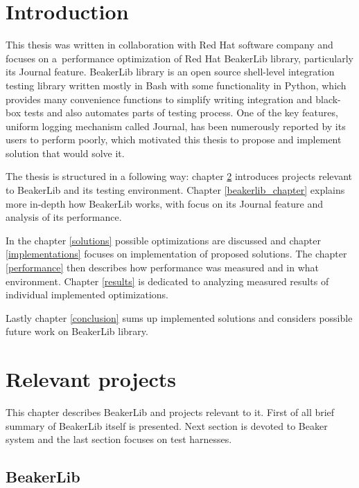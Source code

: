 
\chapter{Introduction}

This thesis was written in collaboration with Red Hat software company and focuses on a~performance optimization of Red Hat BeakerLib library, particularly its Journal feature. BeakerLib library is an open source shell-level integration testing library written mostly in Bash with some functionality in Python, which provides many convenience functions to simplify writing integration and black-box tests and also automates parts of testing process. One of the key features, uniform logging mechanism called Journal, has been numerously reported by its users to perform poorly, which motivated this thesis to propose and implement solution that would solve it. 

The thesis is structured in a following way: chapter \ref{relevant_projects} introduces projects relevant to BeakerLib and its testing environment. Chapter \ref{beakerlib_chapter} explains more in-depth how BeakerLib works, with focus on its Journal feature and analysis of its performance. 

In the chapter \ref{solutions} possible optimizations are discussed and chapter \ref{implementations} focuses on implementation of proposed solutions. The chapter \ref{performance} then describes how performance was measured and in what environment. Chapter \ref{results} is dedicated to analyzing measured results of individual implemented optimizations.


Lastly chapter \ref{conclusion} sums up implemented solutions and considers possible future work on BeakerLib library.

\chapter{Relevant projects}
\label{relevant_projects}

This chapter describes BeakerLib and projects relevant to it. First of all brief summary of BeakerLib itself is presented. Next section is devoted to Beaker system and the last section focuses on test harnesses.

\section{BeakerLib}

